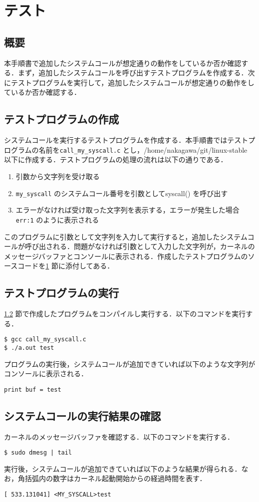\documentclass[12pt]{jsarticle}
\begin{document}
\section{テスト}\label{sec:test}
 \subsection{概要}
 本手順書で追加したシステムコールが想定通りの動作をしているか否か確認する．まず，追加したシステムコールを呼び出すテストプログラムを作成する．次にテストプログラムを実行して，追加したシステムコールが想定通りの動作をしているか否か確認する．
\subsection{テストプログラムの作成}\label{sec:test_sakusei}
システムコールを実行するテストプログラムを作成する．本手順書ではテストプログラムの名前を\verb|call_my_syscall.c| とし，/home/nakagawa/git/linux-stable 以下に作成する．テストプログラムの処理の流れは以下の通りである．
\begin{enumerate}
 \item 引数から文字列を受け取る
 \item \verb|my_syscall| のシステムコール番号を引数としてsyscall() を呼び出す
 \item エラーがなければ受け取った文字列を表示する，エラーが発生した場合\verb|err:1| のように表示される
\end{enumerate}
このプログラムに引数として文字列を入力して実行すると，追加したシステムコールが呼び出される．問題がなければ引数として入力した文字列が，カーネルのメッセージバッファとコンソールに表示される．作成したテストプログラムのソースコードを\ref{sec:test} 節に添付してある．
\subsection{テストプログラムの実行}
\ref{sec:test_sakusei} 節で作成したプログラムをコンパイルし実行する．以下のコマンドを実行する．
\begin{verbatim}
$ gcc call_my_syscall.c
$ ./a.out test
\end{verbatim}
プログラムの実行後，システムコールが追加できていれば以下のような文字列がコンソールに表示される．
\begin{verbatim}
print buf = test
\end{verbatim}
\subsection{システムコールの実行結果の確認}
カーネルのメッセージバッファを確認する．以下のコマンドを実行する．
\begin{verbatim}
$ sudo dmesg | tail
\end{verbatim}
実行後，システムコールが追加できていれば以下のような結果が得られる．なお，角括弧内の数字はカーネル起動開始からの経過時間を表す．
\begin{verbatim}
[ 533.131041] <MY_SYSCALL>test
\end{verbatim}
\end{document}
